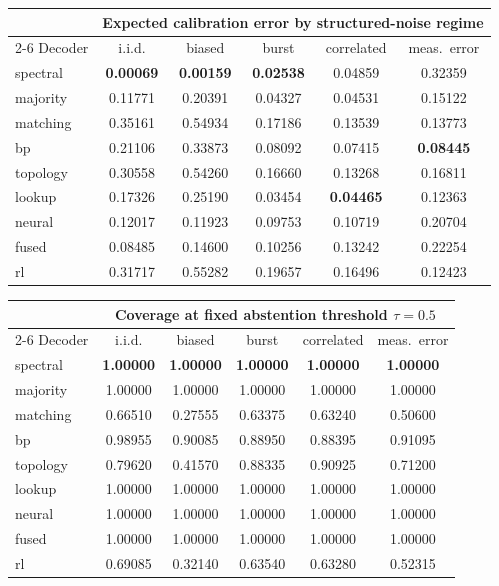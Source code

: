 \begin{tabular}{lccccc}
\toprule
 & \multicolumn{5}{c}{Expected calibration error by structured-noise regime} \\
\cmidrule(lr){2-6}
Decoder & i.i.d. & biased & burst & correlated & meas.\ error \\
\midrule
spectral  & \textbf{0.00069} & \textbf{0.00159} & \textbf{0.02538} & 0.04859 & 0.32359 \\
majority  & 0.11771 & 0.20391 & 0.04327 & 0.04531 & 0.15122 \\
matching  & 0.35161 & 0.54934 & 0.17186 & 0.13539 & 0.13773 \\
bp        & 0.21106 & 0.33873 & 0.08092 & 0.07415 & \textbf{0.08445} \\
topology  & 0.30558 & 0.54260 & 0.16660 & 0.13268 & 0.16811 \\
lookup    & 0.17326 & 0.25190 & 0.03454 & \textbf{0.04465} & 0.12363 \\
neural    & 0.12017 & 0.11923 & 0.09753 & 0.10719 & 0.20704 \\
fused     & 0.08485 & 0.14600 & 0.10256 & 0.13242 & 0.22254 \\
rl        & 0.31717 & 0.55282 & 0.19657 & 0.16496 & 0.12423 \\
\bottomrule
\end{tabular}

\begin{tabular}{lccccc}
\toprule
 & \multicolumn{5}{c}{Coverage at fixed abstention threshold $\tau=0.5$} \\
\cmidrule(lr){2-6}
Decoder & i.i.d. & biased & burst & correlated & meas.\ error \\
\midrule
spectral  & \textbf{1.00000} & \textbf{1.00000} & \textbf{1.00000} & \textbf{1.00000} & \textbf{1.00000} \\
majority  & 1.00000 & 1.00000 & 1.00000 & 1.00000 & 1.00000 \\
matching  & 0.66510 & 0.27555 & 0.63375 & 0.63240 & 0.50600 \\
bp        & 0.98955 & 0.90085 & 0.88950 & 0.88395 & 0.91095 \\
topology  & 0.79620 & 0.41570 & 0.88335 & 0.90925 & 0.71200 \\
lookup    & 1.00000 & 1.00000 & 1.00000 & 1.00000 & 1.00000 \\
neural    & 1.00000 & 1.00000 & 1.00000 & 1.00000 & 1.00000 \\
fused     & 1.00000 & 1.00000 & 1.00000 & 1.00000 & 1.00000 \\
rl        & 0.69085 & 0.32140 & 0.63540 & 0.63280 & 0.52315 \\
\bottomrule
\end{tabular}

